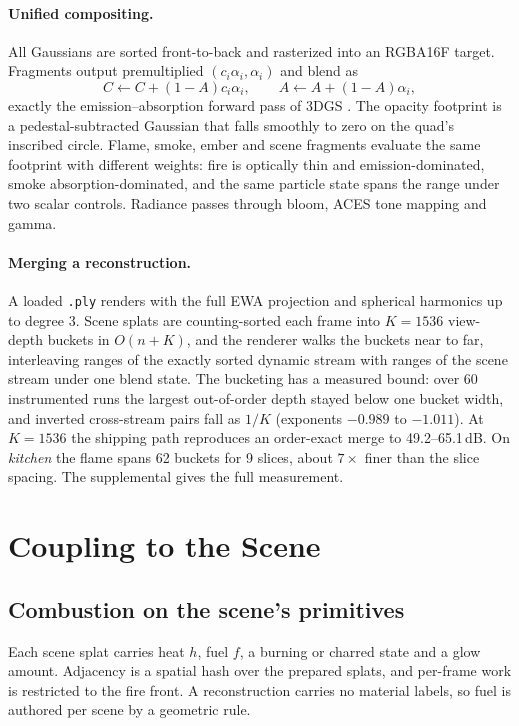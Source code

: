 \documentclass[acmtog,nonacm]{acmart}
\begin{document}
\paragraph{Unified compositing.} All Gaussians are sorted front-to-back and rasterized into an RGBA16F target. Fragments output premultiplied $(c_i\alpha_i,\alpha_i)$ and blend as
\begin{equation}
C\leftarrow C+(1-A)c_i\alpha_i,\qquad A\leftarrow A+(1-A)\alpha_i,
\label{eq:blend}
\end{equation}
exactly the emission--absorption forward pass of 3DGS \cite{kerbl2023,zwicker2001}. The opacity footprint is a pedestal-subtracted Gaussian that falls smoothly to zero on the quad's inscribed circle. Flame, smoke, ember and scene fragments evaluate the same footprint with different weights: fire is optically thin and emission-dominated, smoke absorption-dominated, and the same particle state spans the range under two scalar controls. Radiance passes through bloom, ACES tone mapping \cite{narkowicz2016} and gamma.

\paragraph{Merging a reconstruction.} A loaded \texttt{.ply} renders with the full EWA projection and spherical harmonics up to degree 3. Scene splats are counting-sorted each frame into $K=1536$ view-depth buckets in $O(n+K)$, and the renderer walks the buckets near to far, interleaving ranges of the exactly sorted dynamic stream with ranges of the scene stream under one blend state. The bucketing has a measured bound: over 60 instrumented runs the largest out-of-order depth stayed below one bucket width, and inverted cross-stream pairs fall as $1/K$ (exponents $-0.989$ to $-1.011$). At $K=1536$ the shipping path reproduces an order-exact merge to 49.2--65.1\,dB. On \emph{kitchen} the flame spans 62 buckets for 9 slices, about $7\times$ finer than the slice spacing. The supplemental gives the full measurement.

\section{Coupling to the Scene}
\subsection{Combustion on the scene's primitives}
\label{sec:loop}
Each scene splat carries heat $h$, fuel $f$, a burning or charred state and a glow amount. Adjacency is a spatial hash over the prepared splats, and per-frame work is restricted to the fire front. A reconstruction carries no material labels, so fuel is authored per scene by a geometric rule.
\end{document}
